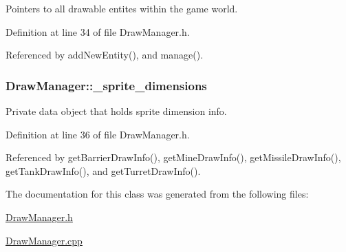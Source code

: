 Pointers to all drawable entites within the game world. 



Definition at line 34 of file Draw\-Manager.\-h.



Referenced by add\-New\-Entity(), and manage().

\hypertarget{classDrawManager_a2cdf54bc1c47a4683f761af0c8ade8e9}{
\subsubsection[{\-\_\-sprite\-\_\-dimensions}]{ Draw\-Manager\-::\-\_\-sprite\-\_\-dimensions\hspace{0.3cm}{\ttfamily [private]}}}\label{classDrawManager_a2cdf54bc1c47a4683f761af0c8ade8e9}


Private data object that holds sprite dimension info. 



Definition at line 36 of file Draw\-Manager.\-h.



Referenced by get\-Barrier\-Draw\-Info(), get\-Mine\-Draw\-Info(), get\-Missile\-Draw\-Info(), get\-Tank\-Draw\-Info(), and get\-Turret\-Draw\-Info().



The documentation for this class was generated from the following files\-:\begin{DoxyCompactItemize}
\item 
\hyperlink{DrawManager_8h}{Draw\-Manager.\-h}\item 
\hyperlink{DrawManager_8cpp}{Draw\-Manager.\-cpp}\end{DoxyCompactItemize}
